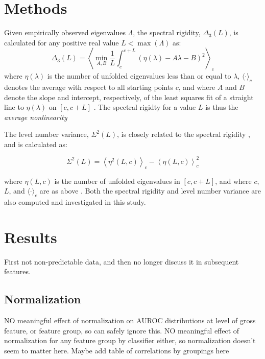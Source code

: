 \documentclass[12pt]{spieman}  %
\begin{document}
\begin{spacing}{2}
\section{Methods}
\label{sect:methods}

Given empirically observed eigenvalues \(\Lambda\), the spectral rigidity, \(\Delta_3(L)\), is
calculated for any positive real value \(L < \max(\Lambda)\) as:
\[
\Delta_3(L) = \left \langle \min_{A,B} \frac{1}{L} \int_c^{c+L} \left(  \eta(\lambda) -A \lambda - B \right)^2 \right \rangle_c
\]
where \(\eta(\lambda)\) is the number of unfolded eigenvalues less than or equal to \(\lambda\),
\(\langle \cdot \rangle_c\) denotes the average with respect to all starting points \(c\), and where
\(A\) and \(B\) denote the slope and intercept, respectively, of the least squares fit of a straight
line to \(\eta(\lambda)\) on \([c, c+L]\) \cite{guhrRandommatrixTheoriesQuantum1998a}. The spectral
rigidty for a value \(L\) is thus the \textit{average nonlinearity}


The level
number variance, \(\Sigma^2(L)\), is closely related to the spectral rigidity
\cite{mehtaRandomMatrices2004}, and is calculated as:

\[
\Sigma^2(L) = \left\langle \eta^2(L, c) \right\rangle_c - \left\langle \eta(L, c) \right\rangle^2_c
\]

where \(\eta(L, c)\) is the number of unfolded eigenvalues in \([c, c+ L]\), and where \(c\), \(L\),
and \(\langle \cdot \rangle_c\) are as above \cite{guhrRandommatrixTheoriesQuantum1998a}. Both the
spectral rigidity and level number variance are also computed and investigated in this study.

\section{Results}
\label{sect:results}

First not non-predictable data, and then no longer discuss it in subsequent features.

\subsection{Normalization}
NO meaningful effect of normalization on AUROC distributions at level of gross feature, or feature
group, so can safely ignore this.
NO meaningful effect of normalization for any feature group by classifier either, so
normalization doesn't seem to matter here.
Maybe add table of correlations by groupings here


\end{spacing}
\end{document}
